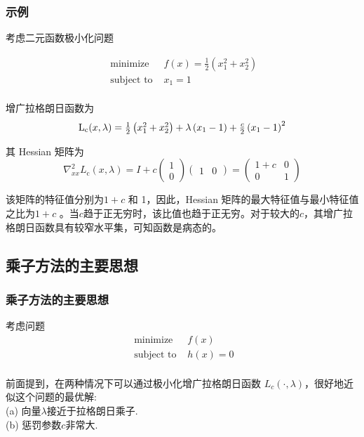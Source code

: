 \documentclass[handout,10pt]{beamer} %
\begin{document}
\begin{frame}
\frametitle{示例}
考虑二元函数极小化问题

\begin{equation}
		\begin{array}{ll}
		\text{ minimize } &f(x)=\frac{1}{2}\left(x_{1}^{2}+x_{2}^{2}\right) \\
		\text { subject to } &x_{1}=1\\
		
		\end{array}
	\end{equation}

增广拉格朗日函数为
\begin{equation}
		\begin{array}{ll}
		\text L_{\mathrm{c}}(x, \lambda)=\frac{1}{2}\left(x_{1}^{2}+x_{2}^{2}\right)+\lambda\left(x_{1}-1\right)+\frac{c}{2}\left(x_{1}-1\right)^{2} \\
		
		
		\end{array}
	\end{equation}

其 Hessian 矩阵为
$$
\nabla_{x x}^{2} L_{\mathrm{c}}(x, \lambda)=I+c\left(\begin{array}{l}
1 \\
0
\end{array}\right)\left(\begin{array}{ll}
1 & 0
\end{array}\right)=\left(\begin{array}{cc}
1+c & 0 \\
0 & 1
\end{array}\right)
$$
\end{frame}

\begin{frame}
\qquad 该矩阵的特征值分别为$1+c$ 和 1，因此，Hessian 矩阵的最大特征值与最小特征值之比为$1+c$ 。当$c$趋于正无穷时，该比值也趋于正无穷。对于较大的$c$，其增广拉格朗日函数具有较窄水平集，可知函数是病态的。\\
\end{frame}




 \subsection{ 乘子方法的主要思想 }

\begin{frame}
\frametitle{乘子方法的主要思想}
考虑问题
\begin{equation}
		\begin{array}{ll}
		\text{ minimize } &f(x) \\
		\text { subject to } &h(x)=0\\
		
		\end{array}
	\end{equation}

前面提到，在两种情况下可以通过极小化增广拉格朗日函数 $L_{c}(\cdot, \lambda)$，很好地近似这个问题的最优解:\\
\bigskip
\qquad (a) 向量$\lambda$接近于拉格朗日乘子.\\
\qquad (b) 惩罚参数$c$非常大.
\end{frame}
\end{document}

